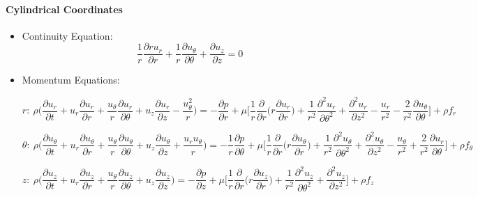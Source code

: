 \documentclass[a4paper]{article}
\begin{document}
    \paragraph{Cylindrical Coordinates} 
        \begin{itemize}
            \item Continuity Equation:
            \[\frac{1}{r}\frac{\partial ru_{r}}{\partial r} + \frac{1}{r}\frac{\partial u_{\theta}}{\partial \theta} + \frac{\partial u_{z}}{\partial z}=0\]
            
            \item Momentum Equations:
            
            \[r: \ \rho \bigg(\frac{\partial u_{r}}{\partial t} + u_{r} \frac{\partial u_{r}}{\partial r} + \frac{u_{\theta}}{r}\frac{\partial u_{r}}{\partial \theta} + u_{z}\frac{\partial u_{r}}{\partial z} - \frac{u_{\theta}^{2}}{r} \bigg) = -\frac{\partial p}{\partial r} + \mu \bigg[ \frac{1}{r}\frac{\partial}{\partial r} \bigg(r \frac{\partial u_{r}}{\partial r}\bigg) + \frac{1}{r^{2}} \frac{\partial^{2} u_{r}}{\partial \theta^{2}} + \frac{\partial^{2} u_{r}}{\partial z^{2}} - \frac{u_{r}}{r^{2}} - \frac{2}{r^{2}}\frac{\partial u_{\theta}}{\partial \theta}\bigg] + \rho f_{r}\]
            
            \[\theta: \ \rho \bigg(\frac{\partial u_{\theta}}{\partial t} + u_{r} \frac{\partial u_{\theta}}{\partial r} + \frac{u_{\theta}}{r} \frac{\partial u_{\theta}}{\partial \theta} + u_{z}\frac{\partial u_{\theta}}{\partial z} + \frac{u_{r}u_{\theta}}{r} \bigg) = -\frac{1}{r} \frac{\partial p}{\partial \theta} + \mu \bigg[ \frac{1}{r}\frac{\partial}{\partial r} \bigg(r \frac{\partial u_{\theta}}{\partial r}\bigg) + \frac{1}{r^{2}} \frac{\partial^{2} u_{\theta}}{\partial \theta^{2}} + \frac{\partial^{2} u_{\theta}}{\partial z^{2}} - \frac{u_{\theta}}{r^{2}} + \frac{2}{r^{2}}\frac{\partial u_{r}}{\partial \theta}\bigg] + \rho f_{\theta}\]
            
            \[z: \ \rho \bigg(\frac{\partial u_{z}}{\partial t} + u_{r} \frac{\partial u_{z}}{\partial r} + \frac{u_{\theta}}{r}\frac{\partial u_{z}}{\partial \theta} + u_{z}\frac{\partial u_{z}}{\partial z} \bigg) = -\frac{\partial p}{\partial z} + \mu \bigg[ \frac{1}{r}\frac{\partial}{\partial r} \bigg(r \frac{\partial u_{z}}{\partial r}\bigg) + \frac{1}{r^{2}} \frac{\partial^{2} u_{z}}{\partial \theta^{2}} + \frac{\partial^{2} u_{z}}{\partial z^{2}} \bigg] + \rho f_{z}\]
        \end{itemize}
    
\end{document}
